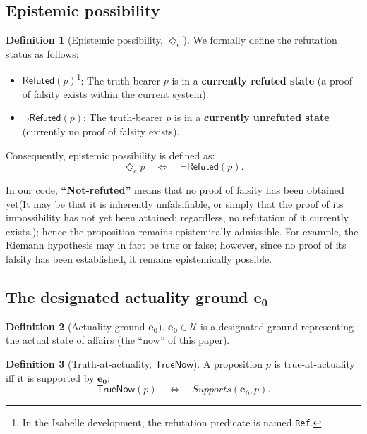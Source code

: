 \documentclass[a4paper, 11pt]{article}
\theoremstyle{plain}
\theoremstyle{definition}
\newtheorem{definition}{Definition}[section]
\newcommand{\U}{\mathcal{U}}               %
\newcommand{\TrueNow}{\mathsf{TrueNow}}   %
\newcommand{\Refuted}{\mathsf{Refuted}}   %
\newcommand{\diamondE}{\Diamond_{e}}      %
\newcommand{\eZero}{\mathbf{e_0}}         %
\begin{document}
\subsection{Epistemic possibility}
\begin{definition}[Epistemic possibility, $\diamondE$]
\label{def:diamond}
We formally define the refutation status as follows:
\begin{itemize}
    \item $\Refuted(p)$\footnote{In the Isabelle development, the refutation predicate is named \texttt{Ref}.}: The truth-bearer $p$ is in a \textbf{currently refuted state} (a proof of falsity exists within the current system).
    \item $\neg \Refuted(p)$: The truth-bearer $p$ is in a \textbf{currently unrefuted state} (currently no proof of falsity exists).
\end{itemize}
Consequently, epistemic possibility is defined as:
\[
\diamondE p \quad \Longleftrightarrow \quad \neg \Refuted(p).
\]
\end{definition}

\noindent
In our code, \textbf{``Not-refuted''} means that no proof of falsity has been obtained yet(It may be that it is inherently unfalsifiable, or simply that the proof of its impossibility has not yet been attained; regardless, no refutation of it currently exists.); hence the proposition remains epistemically admissible. For example, the Riemann hypothesis may in fact be true or false; however, since no proof of its falsity has been established, it remains epistemically possible.

\subsection{The designated actuality ground $\eZero$}
\begin{definition}[Actuality ground $\eZero$]
\label{def:e0}
$\eZero\in\U$ is a designated ground representing the actual state of affairs (the ``now'' of this paper).
\end{definition}

\begin{definition}[Truth-at-actuality, $\TrueNow$]
\label{def:truenow}
A proposition $p$ is true-at-actuality iff it is supported by $\eZero$:
\[
\TrueNow(p) \quad \Longleftrightarrow \quad Supports(\eZero,p).
\]
\end{definition}

\newpage
\end{document}
